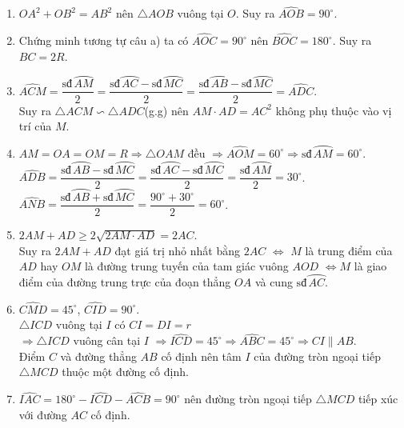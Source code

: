 \begin{bt}
{\begin{center}
		\end{center}
		\begin{enumerate}
			\item $OA^2+OB^2=AB^2$ nên $\triangle AOB$ vuông tại $O$. Suy ra $\widehat{AOB}=90^\circ$.
			\item Chứng minh tương tự câu a) ta có $\widehat{AOC}=90^\circ$ nên $\widehat{BOC}=180^\circ$. Suy ra $BC=2R$.
			\item $\widehat{ACM}=\dfrac{\text{sđ}\,\wideparen{AM}}{2}=\dfrac{\text{sđ}\,\wideparen{AC}-\text{sđ}\,\wideparen{MC}}{2}=\dfrac{\text{sđ}\,\wideparen{AB}-\text{sđ}\,\wideparen{MC}}{2}=\widehat{ADC}$.\\
			Suy ra $\triangle ACM\backsim\triangle ADC$(g.g) nên $AM\cdot AD=AC^2$ không phụ thuộc vào vị trí của $M$.
			\item $AM=OA=OM=R\Rightarrow \triangle OAM$ đều $\Rightarrow\widehat{AOM}=60^\circ\Rightarrow\text{sđ}\,\wideparen{AM}=60^\circ.$\\
			$\widehat{ADB}=\dfrac{\text{sđ}\,\wideparen{AB}-\text{sđ}\,\wideparen{MC}}{2}=\dfrac{\text{sđ}\,\wideparen{AC}-\text{sđ}\,\wideparen{MC}}{2}=\dfrac{\text{sđ}\,\wideparen{AM}}{2}=30^\circ$.\\
			$\widehat{ANB}=\dfrac{\text{sđ}\,\wideparen{AB}+\text{sđ}\,\wideparen{MC}}{2}=\dfrac{90^\circ+30^\circ}{2}=60^\circ$.
			\item $2AM+AD\ge 2\sqrt{2AM\cdot AD}=2AC$.\\
			Suy ra $2AM+AD$ đạt giá trị nhỏ nhất bằng $2AC$ $\Leftrightarrow$ $M$ là trung điểm của $AD$ hay $OM$ là đường trung tuyến của tam giác vuông $AOD$ $\Leftrightarrow M$ là giao điểm của   đường trung trực của đoạn thẳng $OA$ và cung $\text{sđ}\,\wideparen{AC}$.
			\item $\widehat{CMD}=45^\circ$, $\widehat{CID}=90^\circ$.\\
			$\triangle ICD$ vuông tại $I$ có $CI=DI=r$\\ $\Rightarrow \triangle ICD$ vuông cân tại $I$ $\Rightarrow\widehat{ICD}=45^\circ\Rightarrow\widehat{ABC}=45^\circ\Rightarrow CI\parallel AB$.\\ Điểm $C$ và đường thẳng $AB$ cố định nên tâm $I$ của đường tròn ngoại tiếp $\triangle MCD$ thuộc một đường cố định.
			\item $\widehat{IAC}=180^\circ-\widehat{ICD}-\widehat{ACB}=90^\circ$ nên đường tròn ngoại tiếp $\triangle MCD$ tiếp xúc với đường $AC$ cố định.
		\end{enumerate}
	}
\end{bt}


